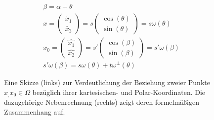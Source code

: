 \begin{figure}[H]
\begin{minipage}[t]{0.4\textwidth}
	\end{minipage}
	\begin{minipage}[b][5cm][t]{0.6\textwidth}
		\begin{align}
			& \beta = \alpha + \theta \label{equa:3.4}\\
			& x = \left(\begin{array}{c} \tilde{x_1} \\ \tilde{x_2} \end{array}\right) = s \left(\begin{array}{c} \cos(\theta) \\ \sin(\theta) \end{array}\right) = s\omega(\theta) \label{equa:3.5}\\
			& x_0 = \left(\begin{array}{c} \hat{x_1} \\ \hat{x_2} \end{array}\right) = s' \left(\begin{array}{c} \cos(\beta) \\ \sin(\beta) \end{array}\right) = s'\omega(\beta) \label{equa:3.6}\\
			& s'\omega(\beta) = s\omega(\theta) + t\omega^{\perp}(\theta)
			\label{equa:3.7}
		\end{align}
	\end{minipage}
	\caption{Eine Skizze (links) zur Verdeutlichung der Beziehung zweier Punkte $x_, x_0 \in \Omega$ bezüglich ihrer kartesischen- und Polar-Koordinaten. Die dazugehörige Nebenrechnung (rechts) zeigt deren formelmäßigen Zusammenhang auf.}
	\label{fig:3.4}
\end{figure}

